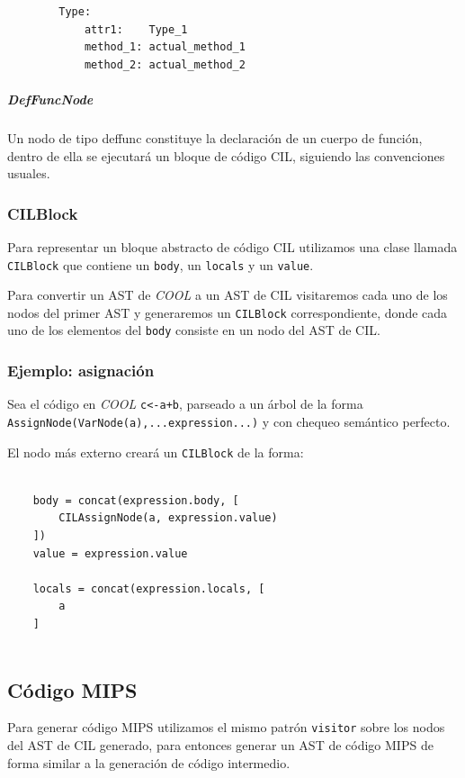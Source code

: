 \documentclass[a4paper,10pt,twocolumn]{article}
\begin{document}
\begin{center}
	\begin{lstlisting}
		Type:
			attr1: 	  Type_1
			method_1: actual_method_1
			method_2: actual_method_2
	\end{lstlisting}
\end{center}

\subparagraph{DefFuncNode}
Un nodo de tipo {deffunc} constituye la declaración de un cuerpo de función, dentro de ella se ejecutará un bloque de código CIL, siguiendo las convenciones usuales. 


\subsubsection{CILBlock}
Para representar un bloque abstracto de código CIL utilizamos una clase llamada \lstinline|CILBlock| que contiene un \lstinline|body|, un \lstinline|locals| y un \lstinline|value|. 

Para convertir un AST de \textit{COOL} a un AST de CIL visitaremos cada uno de los nodos del primer AST y generaremos un \lstinline|CILBlock| correspondiente, donde cada uno de los elementos del \lstinline|body| consiste en un nodo del AST de CIL.

\subsubsection{Ejemplo: asignación}
Sea el código en \textit{COOL} \lstinline|c<-a+b|, parseado a un árbol de la forma \lstinline|AssignNode(VarNode(a),...expression...)| y con chequeo semántico perfecto. 

El nodo más externo creará un \lstinline|CILBlock| de la forma:
	\begin{lstlisting}
	
	body = concat(expression.body, [ 
		CILAssignNode(a, expression.value)
	])
	value = expression.value
	
	locals = concat(expression.locals, [
		a
	]
	
	\end{lstlisting}

\subsection{Código MIPS}

Para generar código MIPS utilizamos el mismo patrón \lstinline|visitor| sobre los nodos del AST de CIL generado, para entonces generar un AST de código MIPS de forma similar a la generación de código intermedio. 
\end{document}
